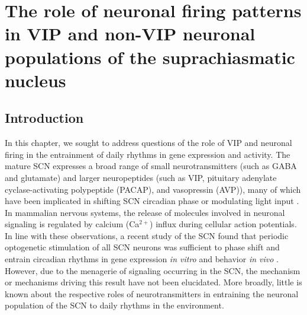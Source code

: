 \chapter{The role of neuronal firing patterns in VIP and non-VIP neuronal populations of the suprachiasmatic nucleus}

\section{Introduction}

In this chapter, we sought to address questions of the role of VIP and neuronal firing in the entrainment of daily rhythms in gene expression and activity.
The mature SCN expresses a broad range of small neurotransmitters (such as GABA and glutamate) and larger neuropeptides (such as VIP, pituitary adenylate cyclase-activating polypeptide (PACAP), and vasopressin (AVP)), many of which have been implicated in shifting SCN circadian phase or modulating light input \cite{Eastman1984, Ding1997, Harrington1999, Hannibal2000, Buijs1995, Mieda2015, Herzog2017}.
In mammalian nervous systems, the release of molecules involved in neuronal signaling is regulated by calcium (Ca$^{2+}$) influx during cellular action potentials.
In line with these observations, a recent study of the SCN found that periodic optogenetic stimulation of all SCN neurons was sufficient to phase shift and entrain circadian rhythms in gene expression \textit{in vitro} and behavior \textit{in vivo} \cite{Jones2015}.
However, due to the menagerie of signaling occurring in the SCN, the mechanism or mechanisms driving this result have not been elucidated.
More broadly, little is known about the respective roles of neurotransmitters in entraining the neuronal population of the SCN to daily rhythms in the environment.

